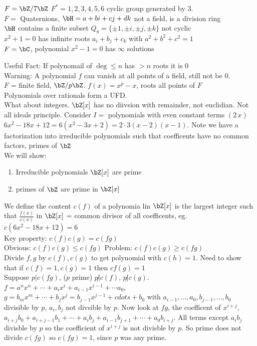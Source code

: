  \begin{example}
    $F = \bZ/7\bZ$ $F^* = 1, 2, 3, 4, 5, 6 $ cyclic group generated by 3. \\
    $F = $ Quaternions, $\bH = a+bi + cj + dk$ not a field, is a division ring \\
    $\bH $ contains a finite subset $Q_8  =\{ \pm 1, \pm i, \pm j, \pm k\}$ not cyclic \\
    $x^2+1=0$ has infinite roots $a_i+ b_j + c_k$ with $a^2+b^2+c^2=1$ \\
    $F = \bC$, polynomial $x^2-1=0$ has $\infty$ solutions
 \end{example}

 \noindent
 Useful Fact: If polynomail of $\deg \le n$ has $>n$ roots it is 0 \\
 Warning: A polynomial $f$ can vanish at all points of a field, still not be 0. \\
 $F$ = finite field, $\bZ/p\bZ$. \quad $f(x)=x^p-x$, roots all points of $F$ \\

 \noindent
 Polynomials over rationals form a UFD. \\
 What about integers. $\bZ[x]$ has no diivsion with remainder, not euclidian. Not all ideals principle. Consider $I =$ polynomials with even constant terms $(2 \, x)$ \\

 \noindent
 $6x^2 - 18x + 12 = 6(x^2-3x+2) = 2 \cdot 3 (x-2)(x-1)$. Note we have a factorization into irreducible polynomials such that coefficents have no common factors, primes of $\bZ$ \\
 We will show: 
 \begin{enumerate}
    \item Irreducible polynomials $\bZ[x]$ are prime 
    \item primes of $\bZ$ are prime in $\bZ[x]$ 
 \end{enumerate}
 We define the content $c(f)$ of a polynomia lin $\bZ[x]$ is the largest integer such that $\frac{f(x)}{c(x)}$ in $\bZ[x]$ = common divisor of all coefficents, eg. $c(6x^2-18x+12)=6$ \\
 Key property: $c(f)c(g)  =c(fg)$ \\ 
 Obvious: $c(f)c(g) \le c(fg)$ \quad Problem: $c(f)c(g) \ge c(fg)$ \\
 Divide $f, g$ by $c(f), c(g)$ to get polynomial with $c(h)=1$. Need to show that if $c(f)=1, c(g)=1$ then $cf(g)=1$ \\
 Suppose $p |c(fg)$, ($p$ prime) $p \not| c(f)$, $p \not| c(g)$. $f = a^nx^n + \cdots + a_ix^i + a_{i-1}x^{i-1} + \cdots a_0$, $g = b_mx^m + \cdots + b_jx^j = b_{j-1}x^{j-1} + cdots + b_0$ with $a_{i-1}, \ldots, a_0, b_{j-1}, \ldots, b_0$ divisible by $p$, $a_i, b_j$ not divsible by $p$. Now look at $fg$, the coefficent of $x^{i+j}$, $a_{i+j}b_0 + a_{i+j-1}b_1 + \cdots + a_ib_j + a_{i-1}b_{j+1} + \cdots + a_0b_{i+j}$. All terms except $a_ib_j$ divisble by $p$ so the coefficient of $x^{i+j}$ is not divisble by $p$. So prime does not divide $c(fg)$ so $c(fg)=1$, since $p$ was any prime. \\

